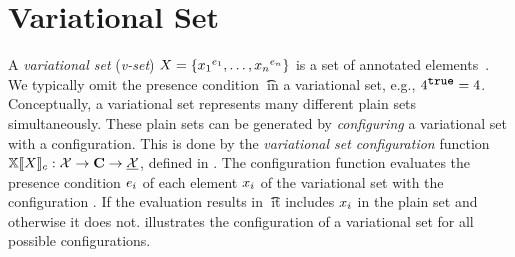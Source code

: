 \section{Variational Set}
\label{sec:vset}




A \emph{variational set} (\emph{v-set}) $\vset = \setDef {\annot [\dimMeta_1] {\elem_1},\ldots, \annot [\dimMeta_n] {\elem_n}}$ 
is a set of annotated elements~\cite{EWC13fosd,Walk14onward,ATW17dbpl}.
We typically omit the presence condition \t\ in a variational set,
e.g., $\annot [\t] 4 = 4$.
%
Conceptually, a variational set represents many different plain sets simultaneously.
These plain sets can be generated by \emph{configuring} a variational set with a configuration.
This is done by the \emph{variational set configuration} function
\ensuremath{\osetSem \vset: \vsetSet \to \confSet \to \psetSet}, defined in .
The configuration function evaluates the presence condition $\dimMeta_i$ of each 
element $\elem_i$ of the variational set with the configuration \config. 
If the evaluation results in \t\ it includes $\elem_i$ in the plain set and otherwise it
does not.  illustrates the configuration of a variational set for all
possible configurations. 

